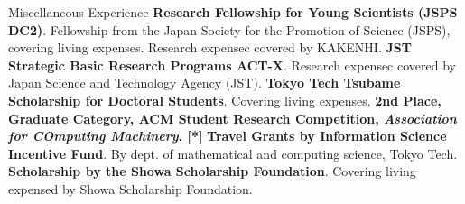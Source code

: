 \begin{rubric}{Miscellaneous Experience}
  \entry*[2021] \textbf{Research Fellowship for Young Scientists (JSPS DC2)}.
  Fellowship from the Japan Society for the Promotion of Science (JSPS), covering
  living expenses. Research expensec covered by KAKENHI.
  \entry*[2020] \textbf{JST Strategic Basic Research Programs ACT-X}. Research
  expensec covered by Japan Science and Technology Agency (JST).
  \entry*[2020] \textbf{Tokyo Tech Tsubame Scholarship for Doctoral
    Students}. Covering living expenses.
  \entry*[2019] \textbf{2nd Place, Graduate Category, ACM Student Research
    Competition, \textit{Association for COmputing Machinery}. [*]}
  \entry*[2019] \textbf{Travel Grants by Information Science Incentive Fund}. By
  dept. of mathematical and computing science, Tokyo Tech.
  \entry*[2014] \textbf{Scholarship by the Showa Scholarship Foundation}. Covering
  living expensed by Showa Scholarship Foundation.
\end{rubric}